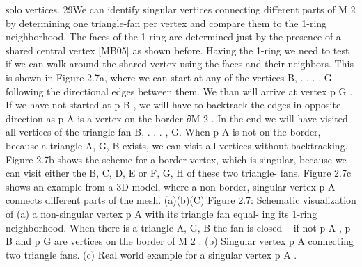 \documentclass[openany]{book}
\begin{document}
solo vertices.
29We can identify singular vertices connecting different parts of M 2 by determining one
triangle-fan per vertex and compare them to the 1-ring neighborhood. The faces of the
1-ring are determined just by the presence of a shared central vertex [MB05] as shown
before. Having the 1-ring we need to test if we can walk around the shared vertex using
the faces and their neighbors. This is shown in Figure 2.7a, where we can start at any
of the vertices {B, . . . , G} following the directional edges between them. We than will
arrive at vertex p G . If we have not started at p B , we will have to backtrack the edges in
opposite direction as p A is a vertex on the border ∂M 2 . In the end we will have visited
all vertices of the triangle fan {B, . . . , G}.
When p A is not on the border, because a triangle {A, G, B} exists, we can visit all
vertices without backtracking. Figure 2.7b shows the scheme for a border vertex, which is
singular, because we can visit either the {B, C, D, E} or {F, G, H} of these two triangle-
fans. Figure 2.7c shows an example from a 3D-model, where a non-border, singular vertex
p A connects different parts of the mesh.
(a)(b)(C)
Figure 2.7: Schematic visualization of (a) a non-singular vertex p A with its triangle fan equal-
ing its 1-ring neighborhood. When there is a triangle {A, G, B} the fan is closed – if not p A , p B
and p G are vertices on the border of M 2 . (b) Singular vertex p A connecting two triangle fans.
(c) Real world example for a singular vertex p A .~\cite[p.~29]{Mara12}
\end{document}
